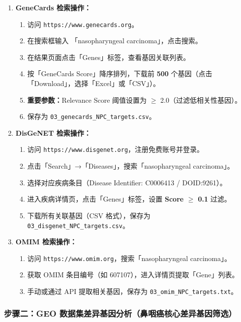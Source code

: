 \documentclass[12pt,a4paper,twoside]{article}
\begin{document}
\begin{enumerate}
  \item \textbf{GeneCards 检索操作：}
    \begin{enumerate}
      \item 访问 \texttt{https://www.genecards.org}。
      \item 在搜索框输入 「nasopharyngeal carcinoma」，点击搜索。
      \item 在结果页面点击「Genes」标签，查看基因关联列表。
      \item 按「GeneCards Score」降序排列，下载前 \textbf{500} 个基因（点击「Download」，选择「Excel」或「CSV」）。
      \item \textbf{重要参数：}Relevance Score 阈值设置为 $\geq$ 2.0（过滤低相关性基因）。
      \item 保存为 \texttt{03\_genecards\_NPC\_targets.csv}。
    \end{enumerate}

  \item \textbf{DisGeNET 检索操作：}
    \begin{enumerate}
      \item 访问 \texttt{https://www.disgenet.org}，注册免费账号并登录。
      \item 点击「Search」→「Diseases」，搜索「nasopharyngeal carcinoma」。
      \item 选择对应疾病条目（Disease Identifier: C0006413 / DOID:9261）。
      \item 进入疾病详情页，点击「Genes」标签，设置 \textbf{Score $\geq$ 0.1} 过滤。
      \item 下载所有关联基因（CSV 格式），保存为 \texttt{03\_disgenet\_NPC\_targets.csv}。
    \end{enumerate}

  \item \textbf{OMIM 检索操作：}
    \begin{enumerate}
      \item 访问 \texttt{https://www.omim.org}，搜索「nasopharyngeal carcinoma」。
      \item 获取 OMIM 条目编号（如 607107），进入详情页提取「Gene」列表。
      \item 手动或通过 API 提取相关基因，保存为 \texttt{03\_omim\_NPC\_targets.txt}。
    \end{enumerate}
\end{enumerate}

\subsubsection{步骤二：GEO 数据集差异基因分析（鼻咽癌核心差异基因筛选）}
\end{document}
